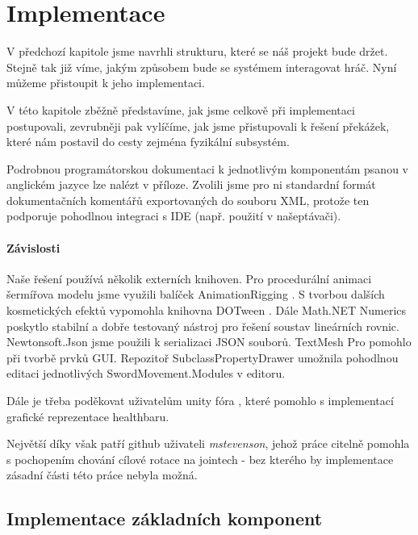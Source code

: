 \chapter{Implementace}

V předchozí kapitole jsme navrhli strukturu, které se náš projekt bude držet. Stejně tak již víme, jakým způsobem bude se systémem interagovat hráč. Nyní můžeme přistoupit k jeho implementaci.

V této kapitole zběžně představíme, jak jsme celkově při implementaci postupovali, zevrubněji pak vylíčíme, jak jsme přistupovali k řešení překážek, které nám postavil do cesty zejména fyzikální subsystém. 

Podrobnou programátorskou dokumentaci k jednotlivým komponentám psanou v anglickém jazyce lze nalézt v příloze. Zvolili jsme pro ni standardní formát dokumentačních komentářů exportovaných do souboru XML, protože ten podporuje pohodlnou integraci s IDE (např. použití v našeptávači).

\subsubsection*{Závislosti}
Naše řešení používá několik externích knihoven. Pro procedurální animaci šermířova modelu jsme využili balíček AnimationRigging \cite{AnimationRigging}. S tvorbou dalších kosmetických efektů vypomohla knihovna DOTween \cite{DoTween}. Dále Math.NET Numerics \cite{MathDotNetNumerics} poskytlo stabilní a dobře testovaný nástroj pro řešení soustav lineárních rovnic. Newtonsoft.Json \cite{NewtonsoftJson} jsme použili k serializaci JSON souborů. TextMesh Pro \cite{TextMeshPro} pomohlo při tvorbě prvků GUI. Repozitoř SubclassPropertyDrawer \cite{SubclassPropertyDrawer} umožnila pohodlnou editaci jednotlivých SwordMovement.Modules v editoru. 

Dále je třeba poděkovat uživatelům unity fóra \cite{InvertReverseUIMask}, které pomohlo s implementací grafické reprezentace healthbaru.

Největší díky však patří github uživateli \textit{mstevenson}, jehož práce \cite{ConfigurableJointExtensions} citelně pomohla s pochopením chování cílové rotace na jointech - bez kterého by implementace zásadní části této práce nebyla možná.


\section{Implementace základních komponent}


